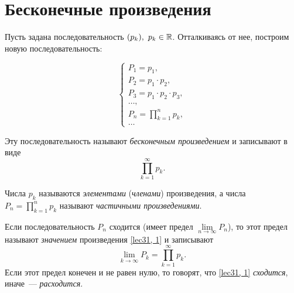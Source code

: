 \documentclass[../../main.tex]{subfiles}
\begin{document}
	\section{Бесконечные произведения}

	Пусть задана последовательность $(p_k),\ p_k \in \R$. Отталкиваясь от нее, 
	построим новую последовательность:

	\[
	\begin{cases}
	P_1 = p_1, \\
	P_2 = p_1 \cdot p_2, \\
	P_3 = p_1 \cdot p_2 \cdot p_3, \\
	\ldots, \\
	P_n = \prod\limits_{k = 1}^{n} p_k, \\
	\ldots
	\end{cases} 
	\]

	Эту последовательность называют \emph{бесконечным произведением} и записывают 
	в виде
	\begin{equation} \label{lec31, 1}
		\prod\limits_{k = 1}^{\infty} p_k.
	\end{equation}
	
	Числа $p_k$ называются \emph{элементами} (\emph{членами}) произведения, а 
	числа $P_n = 
	\prod\limits_{k = 1}^{n} p_k$ называют \emph{частичными произведениями}.
	
	Если последовательность $P_n$ сходится (имеет предел $\lim\limits_{n \to 
	\infty}P_n$), то этот предел называют \emph{значением} произведения 
	\eqref{lec31, 
	1} и записывают
	\[\lim_{k\to\infty} P_k = \prod\limits_{k=1}^\infty p_k.\]
	Если этот предел конечен и не равен нулю, то говорят, что \eqref{lec31, 
	1} \emph{сходится}, иначе~--- \emph{расходится}.
	
\end{document}
